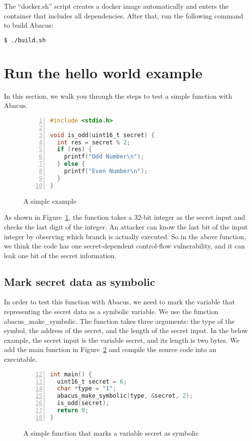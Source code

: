 \documentclass[10pt,conference]{IEEEtran}
\newcommand{\tool}{\textsf{Abacus}}
\begin{document}
The ``docker.sh'' script creates a docker image automatically and enters the container that includes all dependencies. After that, run the following command to build \tool{}:

\begin{lstlisting}[language=bash]
$ ./build.sh
\end{lstlisting}
\section{Run the hello world example}
In this section, we walk you through the steps to test a simple function with \tool{}.

\begin{figure}[h]
\begin{lstlisting}[xleftmargin=.07\textwidth, xrightmargin=.07\textwidth,numbers=left, frame=single, language=C]
#include <stdio.h>

void is_odd(uint16_t secret) {
  int res = secret % 2;        
  if (res) {             
    printf("Odd Number\n");
  } else {
    printf("Even Number\n");
  }
}
\end{lstlisting}
\caption{A simple example}
\label{fig:example0}
\end{figure}

As shown in Figure~\ref{fig:example0}, the function takes a 32-bit integer as the secret input and checks the last digit of the integer. An attacker can know the last bit of the input integer by observing which branch is actually executed. So in the above function, we think the code has one secret-dependent control-flow vulnerability, and it can leak one bit of the secret information.

\subsection{Mark secret data as symbolic}
In order to test this function with \tool{}, we need to mark the variable that representing the secret data as a symbolic variable. We use the function \textsf{abacus\_make\_symbolic}. The function takes three arguments: the type of the symbol, the address of the secret, and the length of the secret input. In the below example, the secret input is the variable \textsf{secret}, and its length is two bytes. We add the \textsf{main} function in Figure~\ref{fig:example1} and compile the source code into an executable.

\begin{figure}[h]
\begin{lstlisting}[firstnumber=12, xleftmargin=.07\textwidth, xrightmargin=.07\textwidth, numbers=left, frame=single, language=C]
int main() {
  uint16_t secret = 6;
  char *type = "1";
  abacus_make_symbolic(type, &secret, 2); 
  is_odd(secret);
  return 0;
}
\end{lstlisting}
\caption{A simple function that marks a variable \textsf{secret} as symbolic}
\label{fig:example1}
\end{figure}
\end{document}
